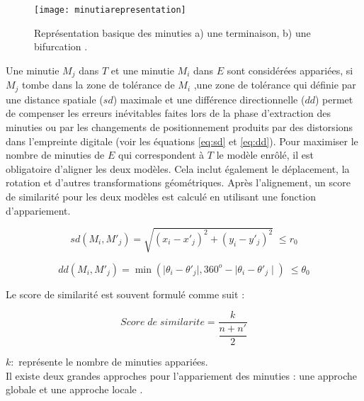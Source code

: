 \begin{center}
	\begin{figure}[H]
		\centering
		\texttt{[image: minutiarepresentation]}
		\captionsetup{justification=centering}
		\caption{Représentation basique des minuties a) une terminaison, b) une bifurcation \citep{maltoni2009handbook}.}
		\label{fig:chapitre2minutiarepresentation}
	\end{figure}
\end{center}
Une minutie $ M_{j} $ dans $  T $ et une minutie $  M_{i} $ dans $ E $ sont considérées appariées, si $ M_{j} $  tombe dans la zone de tolérance de $ M_{i} $ ,une zone de tolérance qui définie par  une distance spatiale ($ sd $) maximale et une différence directionnelle ($ dd $) permet de compenser les erreurs inévitables faites lors de la phase d'extraction des minuties ou par les changements de positionnement produits par des distorsions dans l'empreinte digitale (voir les équations \ref{eq:sd} et \ref{eq:dd}). Pour maximiser le nombre de minuties de $ E $ qui correspondent à $ T $ le modèle enrôlé, il est obligatoire d'aligner les deux modèles. Cela inclut également le déplacement, la rotation et d'autres transformations géométriques. Après l'alignement, un score de similarité pour les deux modèles est calculé en utilisant une fonction d'appariement.

\begin{center}
	\begin{equation}	
	\label{eq:sd}	
	sd(M_{i},M\prime_{j})=\sqrt{(x_{i}-x\prime _{j})^{2}+(y_{i}-y\prime _{j})^{2}} \; \leq r_{0}
	\end{equation}
\end{center}
\begin{center}
	\begin{equation}\label{eq:dd}	
	dd(M_{i},M'_{j})=\min(\mid\theta_{i}-\theta \prime _{j}\mid, 360^{o} - \mid\theta_{i}-\theta \prime _{j}\mid) \; \leq \theta_{0}
	\end{equation}
\end{center}
Le score de similarité est souvent formulé comme suit \citep{maltoni2009handbook} :
\begin{center}
	\begin{equation}\label{eq:ss}	
Score\;de\; similarite=\dfrac{k}{\dfrac{n+n \prime}{2}}
	\end{equation}
\end{center}
\textbf{$ k : $} représente le nombre de minuties appariées.
\\
Il existe deux grandes approches pour l'appariement des minuties  : une approche globale et une approche locale \citep{maltoni2009handbook}.
